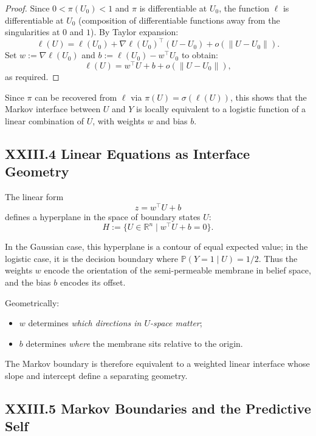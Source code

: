 \documentclass[12pt,letterpaper]{article}
\begin{document}
\begin{proof}
Since $0 < \pi(U_0) < 1$ and $\pi$ is differentiable at $U_0$, the function $\ell$ is differentiable at $U_0$ (composition of differentiable functions away from the singularities at $0$ and $1$). By Taylor expansion:
\[
\ell(U) = \ell(U_0) + \nabla \ell(U_0)^\top (U - U_0) + o(\|U - U_0\|).
\]
Set $w := \nabla \ell(U_0)$ and $b := \ell(U_0) - w^\top U_0$ to obtain:
\[
\ell(U) = w^\top U + b + o(\|U - U_0\|),
\]
as required.
\end{proof}

Since $\pi$ can be recovered from $\ell$ via $\pi(U) = \sigma(\ell(U))$, this shows that the Markov interface between $U$ and $Y$ is locally equivalent to a logistic function of a linear combination of $U$, with weights $w$ and bias $b$.

\subsection{XXIII.4 Linear Equations as Interface Geometry}

The linear form
\[
z = w^\top U + b
\]
defines a hyperplane in the space of boundary states $U$:
\[
H := \{U \in \mathbb{R}^n \mid w^\top U + b = 0\}.
\]

In the Gaussian case, this hyperplane is a contour of equal expected value; in the logistic case, it is the decision boundary where $\mathbb{P}(Y=1 \mid U) = 1/2$. Thus the weights $w$ encode the orientation of the semi-permeable membrane in belief space, and the bias $b$ encodes its offset.

Geometrically:

\begin{itemize}
  \item $w$ determines \emph{which directions in $U$-space matter};
  \item $b$ determines \emph{where} the membrane sits relative to the origin.
\end{itemize}

The Markov boundary is therefore equivalent to a weighted linear interface whose slope and intercept define a separating geometry.

\subsection{XXIII.5 Markov Boundaries and the Predictive Self}
\end{document}
